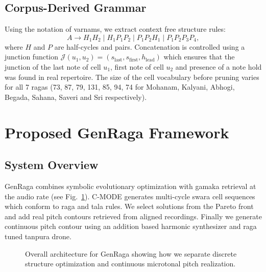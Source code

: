 \documentclass[conference,letterpaper]{IEEEtran}
\begin{document}
\subsection{Corpus-Derived Grammar}
Using the notation of varnams, we extract context free structure rules:
\begin{equation}
 A \rightarrow H_1 H_2 \mid H_1 P_1 P_2 \mid P_1 P_2 H_1 \mid P_1 P_2 P_3 P_4,
\end{equation}
where $H$ and $P$ are half-cycles and pairs. Concatenation is controlled using a junction function $\mathcal{J}(u_1, u_2) = (s_{\text{last}}, s_{\text{first}}, h_{\text{lead}})$ which ensures that the junction of the last note of cell $u_1$, first note of cell $u_2$ and presence of a note hold was found in real repertoire. The size of the cell vocabulary before pruning varies for all 7 ragas (73, 87, 79, 131, 85, 94, 74 for Mohanam, Kalyani, Abhogi, Begada, Sahana, Saveri and Sri respectively).

\section{Proposed GenRaga Framework}
\subsection{System Overview}
GenRaga combines symbolic evolutionary optimization with gamaka retrieval at the audio rate (see Fig.~\ref{fig:overall}). C-MODE generates multi-cycle swara cell sequences which conform to raga and tala rules. We select solutions from the Pareto front and add real pitch contours retrieved from aligned recordings. Finally we generate continuous pitch contour using an addition based harmonic synthesizer and raga tuned tanpura drone.

\begin{figure}[t]
\centering
{}
\caption{Overall architecture for GenRaga showing how we separate discrete structure optimization and continuous microtonal pitch realization.}
\label{fig:overall}
\end{figure}
\end{document}
